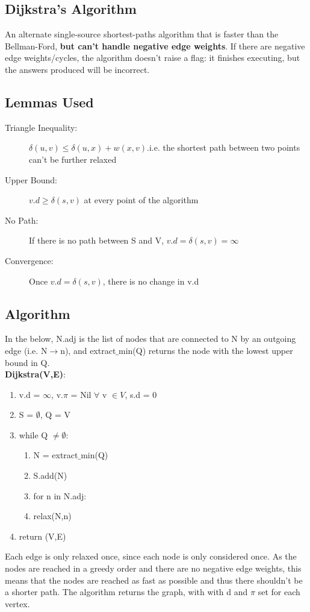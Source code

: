 \subsection{Dijkstra's Algorithm}
An alternate single-source shortest-paths algorithm that is faster than the Bellman-Ford, \textbf{but can't handle negative edge weights}. If there are negative edge weights/cycles, the algorithm doesn't raise a flag: it finishes executing, but the answers produced will be incorrect. 

\subsection{Lemmas Used}
\begin{description}
    \item [Triangle Inequality:] \(\delta(u,v) \leq \delta(u,x) + w(x,v)\).i.e. the shortest path between two points can't be further relaxed
    \item [Upper Bound:] \(v.d \geq \delta (s,v) \) at every point of the algorithm
    \item [No Path:] If there is no path between S and V, $v.d=\delta(s,v)=\infty$
    \item [Convergence:] Once \(v.d = \delta (s,v)\), there is no change in v.d
\end{description}

\subsection{Algorithm}
In the below, N.adj is the list of nodes that are connected to N by an outgoing edge (i.e. N$\rightarrow$n), and extract$\_$min(Q) returns the node with the lowest upper bound in Q.\\
\textbf{Dijkstra(V,E)}:
\begin{enumerate}[label=\Alph*]
    \item v.d = $\infty$, v.$\pi$ = Nil $\forall$ v $\in V$, s.d = 0
    \item S = $\emptyset$, Q = V 
    \item while Q $\neq\emptyset $: 
\begin{enumerate}[label=\arabic*]
    \item N = extract$\_$min(Q)
    \item S.add(N)
    \item for n in N.adj:
    \item [] \quad relax(N,n)
\end{enumerate}  
\item return (V,E)
\end{enumerate}
Each edge is only relaxed once, since each node is only considered once. As the nodes are reached in a greedy order and there are no negative edge weights, this means that the nodes are reached as fast as possible and thus there shouldn't be a shorter path. The algorithm returns the graph, with with d and $\pi$ set for each vertex.

